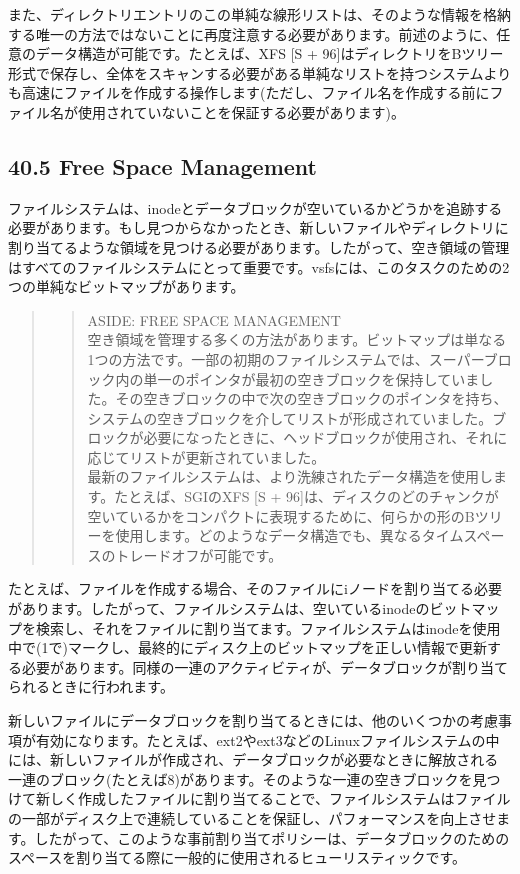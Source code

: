 また、ディレクトリエントリのこの単純な線形リストは、そのような情報を格納する唯一の方法ではないことに再度注意する必要があります。前述のように、任意のデータ構造が可能です。たとえば、XFS
{[}S +
96{]}はディレクトリをBツリー形式で保存し、全体をスキャンする必要がある単純なリストを持つシステムよりも高速にファイルを作成する操作します(ただし、ファイル名を作成する前にファイル名が使用されていないことを保証する必要があります)。

\hypertarget{free-space-management-1}{%
\subsection*{40.5 Free Space Management}\label{free-space-management-1}}

ファイルシステムは、inodeとデータブロックが空いているかどうかを追跡する必要があります。もし見つからなかったとき、新しいファイルやディレクトリに割り当てるような領域を見つける必要があります。したがって、空き領域の管理はすべてのファイルシステムにとって重要です。vsfsには、このタスクのための2つの単純なビットマップがあります。

\begin{quote}
\begin{quote}
ASIDE: FREE SPACE MANAGEMENT\\
空き領域を管理する多くの方法があります。ビットマップは単なる1つの方法です。一部の初期のファイルシステムでは、スーパーブロック内の単一のポインタが最初の空きブロックを保持していました。その空きブロックの中で次の空きブロックのポインタを持ち、システムの空きブロックを介してリストが形成されていました。ブロックが必要になったときに、ヘッドブロックが使用され、それに応じてリストが更新されていました。\\
最新のファイルシステムは、より洗練されたデータ構造を使用します。たとえば、SGIのXFS
{[}S +
96{]}は、ディスクのどのチャンクが空いているかをコンパクトに表現するために、何らかの形のBツリーを使用します。どのようなデータ構造でも、異なるタイムスペースのトレードオフが可能です。
\end{quote}
\end{quote}

たとえば、ファイルを作成する場合、そのファイルにiノードを割り当てる必要があります。したがって、ファイルシステムは、空いているinodeのビットマップを検索し、それをファイルに割り当てます。ファイルシステムはinodeを使用中で(1で)マークし、最終的にディスク上のビットマップを正しい情報で更新する必要があります。同様の一連のアクティビティが、データブロックが割り当てられるときに行われます。

新しいファイルにデータブロックを割り当てるときには、他のいくつかの考慮事項が有効になります。たとえば、ext2やext3などのLinuxファイルシステムの中には、新しいファイルが作成され、データブロックが必要なときに解放される一連のブロック(たとえば8)があります。そのような一連の空きブロックを見つけて新しく作成したファイルに割り当てることで、ファイルシステムはファイルの一部がディスク上で連続していることを保証し、パフォーマンスを向上させます。したがって、このような事前割り当てポリシーは、データブロックのためのスペースを割り当てる際に一般的に使用されるヒューリスティックです。

